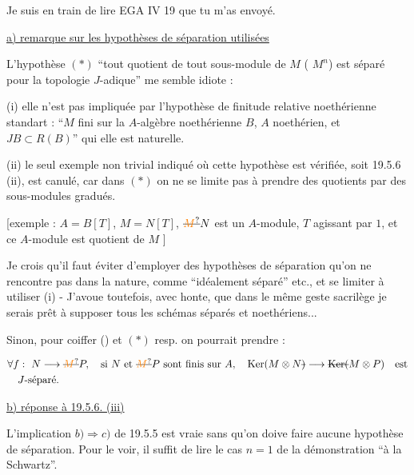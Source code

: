 Je suis en train de lire EGA IV 19 que tu m'as envoyé.

\uline{a) remarque sur les hypothèses de séparation utilisées}

L'hypothèse $(*)$ ``tout quotient de tout sous-module de $M$  ( $M^n$) est séparé pour la topologie $J$-adique'' me semble idiote :

(i) elle  n'est pas impliquée par l'hypothèse de finitude relative noethérienne standart : ``$M$ fini sur la $A$-algèbre noethérienne $B$, $A$ noethérien, et $JB\subset R(B)$'' qui elle est naturelle.



(ii) le seul exemple non trivial indiqué où cette hypothèse est vérifiée, soit 19.5.6 (ii), est canulé, car \deleted{$(*)$} dans $(*)$ on ne se limite pas à prendre des quotients par des sous-modules gradués.



[exemple : $A=B[T]$, $M=N[T]$, $\deleted{\unsure{M}}N$ est un $A$-module, $T$ agissant par $1$, et ce $A$-module est quotient de $M$ ]

Je crois qu'il faut éviter d'employer des hypothèses de séparation qu'on ne rencontre pas dans la nature, comme ``idéalement séparé'' etc., et se limiter à utiliser (i) - J'avoue toutefois, avec honte, que dans le même geste sacrilège je serais prêt à supposer tous les schémas séparés et noethériens...

Sinon, pour coiffer () et $(*)$ resp. on pourrait prendre :

\margin{!\ $\Bigg($}

\[
\begin{aligned}
&\forall f:\ N\longrightarrow \deleted{\unsure{M}}P,\quad \text{si } N \text{ et } \deleted{\unsure{M}}P \text{ sont finis sur } A,\quad \operatorname{Ker}(M\otimes N\deleted{)}\longrightarrow\deleted{\operatorname{Ker}}\deleted{(}M\otimes P)\quad\text{est}\\
&\quad J\text{-séparé.}
\end{aligned}
\]

\uline{b) réponse à 19.5.6. (iii)}

L'implication $b)\Rightarrow c)$ de 19.5.5 est vraie sans qu'on doive faire aucune hypothèse de séparation. Pour le voir, il suffit de lire le cas $n=1$ de la démonstration ``à la Schwartz''.

